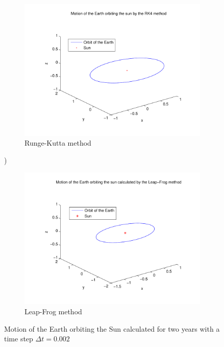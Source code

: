 \documentclass[a4paper,12pt, english]{article}
\begin{document}
\begin{figure}
        \centering
        \begin{subfigure}[b]{0.6\textwidth}
                \includegraphics[width=\textwidth]{RK4_n_1000_t_2.pdf}
                \caption{Runge-Kutta method}
                \label{fig:RK4_dt_0.002}
        \end{subfigure}%
 )
        \begin{subfigure}[b]{0.6\textwidth}
                \includegraphics[width=\textwidth]{LF_n_1000_t_2.pdf}
                \caption{Leap-Frog method}
                \label{fig:LF_dt_0.002}
        \end{subfigure}
        \caption{Motion of the Earth orbiting the Sun calculated for two years with a time step $\Delta t = 0.002$}
\label{dt_0.002}
\end{figure}
\end{document}
